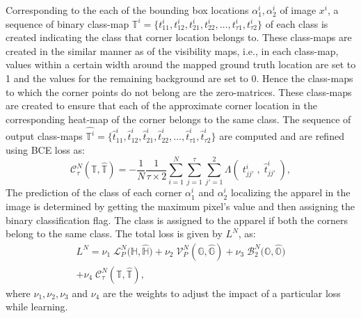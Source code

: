 \documentclass[conference]{IEEEtran}
\begin{document}
Corresponding to the each of the bounding box locations $\alpha^i_1,\alpha^i_2$ of image $x^i$, a sequence of binary class-map $\mathbb{T}^i= \{t^i_{11},t^i_{12}, t^i_{21},t^i_{22}, \dots, t^i_{\tau1} , t^i_{\tau2}\}$ of each class is created indicating the class that corner location belongs to. These class-maps are created in the similar manner as of the visibility maps, i.e., in each class-map, values within a certain width around the mapped ground truth location are set to 1 and the values for the remaining background are set to 0. Hence the class-maps to which the corner points do not belong are the zero-matrices. These class-maps are created to ensure that each of the approximate corner location in the corresponding heat-map of the corner belongs to the same class.
The sequence of output class-maps $\hat{\mathbb{T}^i}= \{\hat{t}^i_{11},\hat{t}^i_{12}, \hat{t}^i_{21},\hat{t}^i_{22}, \dots, \hat{t}^i_{\tau1} , \hat{t}^i_{\tau2}\}$ are computed and are refined using BCE loss as:
% 
\begin{equation}
  \mathcal{C}^N_{\tau} (\mathbb{T}, \hat{\mathbb{T}}) = - \frac{1}{N} \frac{1}{\tau \times 2} \sum_{i = 1}^{N} \sum_{j = 1}^{{\tau}} \sum_{j' = 1}^{2} \Lambda(\;t^i_{jj'} \; , \; \hat{t}^i_{jj'}\;),
\end{equation}
The prediction of the class of each corner $\alpha^i_1$ and $\alpha^i_2$ localizing the apparel in the image is determined by getting the maximum pixel's value and then assigning the binary classification flag. The class is assigned to the apparel if both the corners belong to the same class. 
The total loss is given by $L^N$, as:
%
\begin{equation}
\begin{split}
   L^N = \nu_1 \; \mathcal{L}^{N}_P \big( \mathbb{H} , \hat{\mathbb{H}}\big) + \nu_2 \; \mathcal{V}^N_P (\mathbb{G}, \hat{\mathbb{G}}) + \nu_3 \;\mathcal{B}^{N}_2 \big( \mathbb{O} , \hat{\mathbb{O}}\big) 
\\
+ \nu_4 \; \mathcal{C}^N_{\tau} (\mathbb{T}, \hat{\mathbb{T}}),   
\end{split}
\end{equation}
%
where $\nu_1, \nu_2, \nu_3$ and  $\nu_4$ are the weights to adjust the impact of a particular loss while learning.
\end{document}
